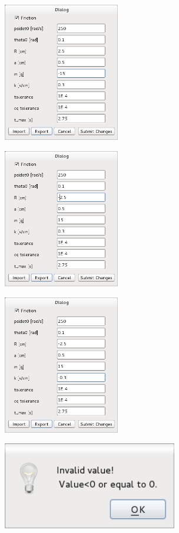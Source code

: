 \includegraphics[width=2in,keepaspectratio=true]
{figures/paremeter_window_negative_mass.png}

\includegraphics[width=2in,keepaspectratio=true]{figures/paremeter_window_negative_R.png}

\includegraphics[width=2in,keepaspectratio=true]{figures/paremeterwindow_negative_k.png}
\medskip

\includegraphics[width=3in,keepaspectratio=true]{figures/parameter_window_parameter_exception.png}

